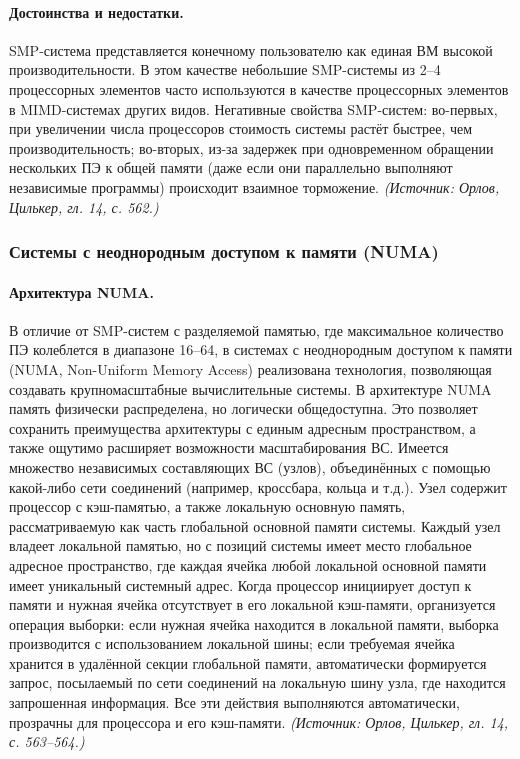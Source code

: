 \documentclass[a4paper,12pt]{article}
\begin{document}
\paragraph{Достоинства и недостатки.}
SMP-система представляется конечному пользователю как единая ВМ высокой производительности. В этом качестве небольшие SMP-системы из 2–4 процессорных элементов часто используются в качестве процессорных элементов в MIMD-системах других видов. Негативные свойства SMP-систем: во-первых, при увеличении числа процессоров стоимость системы растёт быстрее, чем производительность; во-вторых, из-за задержек при одновременном обращении нескольких ПЭ к общей памяти (даже если они параллельно выполняют независимые программы) происходит взаимное торможение.
\textit{(Источник: Орлов, Цилькер, гл. 14, с. 562.)}

\subsubsection{Системы с неоднородным доступом к памяти (NUMA)}

\paragraph{Архитектура NUMA.}
В отличие от SMP-систем с разделяемой памятью, где максимальное количество ПЭ колеблется в диапазоне 16–64, в системах с неоднородным доступом к памяти (NUMA, Non-Uniform Memory Access) реализована технология, позволяющая создавать крупномасштабные вычислительные системы. В архитектуре NUMA память физически распределена, но логически общедоступна. Это позволяет сохранить преимущества архитектуры с единым адресным пространством, а также ощутимо расширяет возможности масштабирования ВС. Имеется множество независимых составляющих ВС (узлов), объединённых с помощью какой-либо сети соединений (например, кроссбара, кольца и т.д.). Узел содержит процессор с кэш-памятью, а также локальную основную память, рассматриваемую как часть глобальной основной памяти системы. Каждый узел владеет локальной памятью, но с позиций системы имеет место глобальное адресное пространство, где каждая ячейка любой локальной основной памяти имеет уникальный системный адрес. Когда процессор инициирует доступ к памяти и нужная ячейка отсутствует в его локальной кэш-памяти, организуется операция выборки: если нужная ячейка находится в локальной памяти, выборка производится с использованием локальной шины; если требуемая ячейка хранится в удалённой секции глобальной памяти, автоматически формируется запрос, посылаемый по сети соединений на локальную шину узла, где находится запрошенная информация. Все эти действия выполняются автоматически, прозрачны для процессора и его кэш-памяти.
\textit{(Источник: Орлов, Цилькер, гл. 14, с. 563--564.)}
\end{document}
